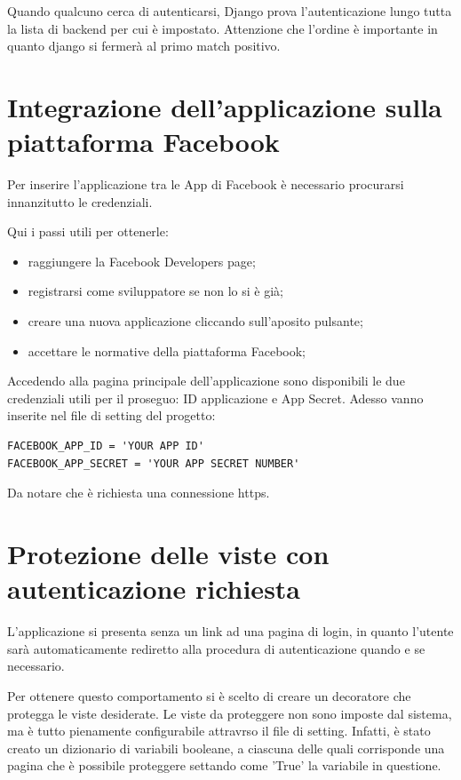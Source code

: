 Quando qualcuno cerca di autenticarsi, Django prova l'autenticazione lungo tutta la lista di backend per cui è impostato. 
Attenzione che l'ordine è importante in quanto django si fermerà al primo match positivo.


\section{Integrazione dell'applicazione sulla piattaforma Facebook}
Per inserire l'applicazione tra le App di Facebook è necessario procurarsi innanzitutto le credenziali.

Qui i passi utili per ottenerle:
\begin{itemize}
	\item raggiungere la Facebook Developers page;
	\item registrarsi come sviluppatore se non lo si è già;
	\item creare una nuova applicazione cliccando sull'aposito pulsante;
	\item accettare le normative della piattaforma Facebook;
\end{itemize}
Accedendo alla pagina principale dell'applicazione sono disponibili le due credenziali utili per il proseguo: ID applicazione e App Secret.
Adesso vanno inserite nel file di setting del progetto:

\begin{lstlisting}
FACEBOOK_APP_ID = 'YOUR APP ID'
FACEBOOK_APP_SECRET = 'YOUR APP SECRET NUMBER'
\end{lstlisting}


Da notare che è richiesta una connessione https.

\section{Protezione delle viste con autenticazione richiesta}
L'applicazione si presenta senza un link ad una pagina di login, in quanto l'utente sarà automaticamente rediretto alla procedura di autenticazione quando e se necessario. 

Per ottenere questo comportamento si è scelto di creare un decoratore che protegga le viste desiderate.
Le viste da proteggere non sono imposte dal sistema, ma è tutto pienamente configurabile attravrso il file di setting. Infatti, è stato creato un dizionario di variabili booleane, a ciascuna delle quali corrisponde una pagina che è possibile proteggere settando come 'True' la variabile in questione.

